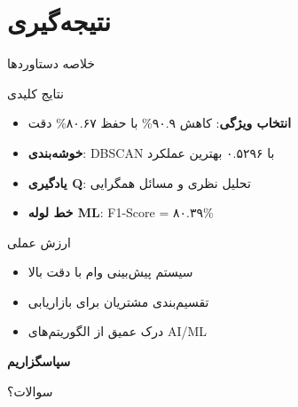 \documentclass[aspectratio=169]{beamer}
\begin{document}
\section{نتیجه‌گیری}

\begin{frame}{خلاصه دستاوردها}
\begin{block}{نتایج کلیدی}
\begin{itemize}
\item \textbf{انتخاب ویژگی}: کاهش ۹۰.۹\% با حفظ ۸۰.۶۷\% دقت
\item \textbf{خوشه‌بندی}: DBSCAN با ۰.۵۲۹۶ بهترین عملکرد
\item \textbf{یادگیری Q}: تحلیل نظری و مسائل همگرایی
\item \textbf{خط لوله ML}: F1-Score = ۸۰.۳۹\%
\end{itemize}
\end{block}

\begin{block}{ارزش عملی}
\begin{itemize}
\item سیستم پیش‌بینی وام با دقت بالا
\item تقسیم‌بندی مشتریان برای بازاریابی
\item درک عمیق از الگوریتم‌های AI/ML
\end{itemize}
\end{block}
\end{frame}

\begin{frame}
\begin{center}
\Huge \textbf{سپاسگزاریم}

\vspace{1cm}

\Large سوالات؟
\end{center}
\end{frame}
\end{document}
